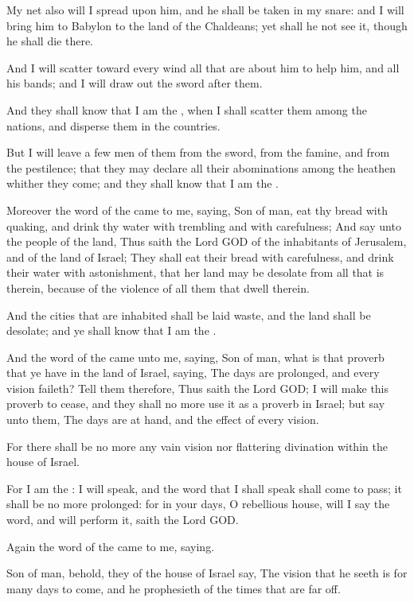 \Verse My net also will I spread upon him, and he shall be taken in my snare: and I will bring him to Babylon to the land of the Chaldeans; yet shall he not see it, though he shall die there.

\Verse And I will scatter toward every wind all that are about him to help him, and all his bands; and I will draw out the sword after them.

\Verse And they shall know that I am the \LORD, when I shall scatter them among the nations, and disperse them in the countries.

\Verse But I will leave a few men of them from the sword, from the famine, and from the pestilence; that they may declare all their abominations among the heathen whither they come; and they shall know that I am the \LORD.

\Verse Moreover the word of the \LORD came to me, saying, \Verse Son of man, eat thy bread with quaking, and drink thy water with trembling and with carefulness; \Verse And say unto the people of the land, Thus saith the Lord GOD of the inhabitants of Jerusalem, and of the land of Israel; They shall eat their bread with carefulness, and drink their water with astonishment, that her land may be desolate from all that is therein, because of the violence of all them that dwell therein.

\Verse And the cities that are inhabited shall be laid waste, and the land shall be desolate; and ye shall know that I am the \LORD.

\Verse And the word of the \LORD came unto me, saying, \Verse Son of man, what is that proverb that ye have in the land of Israel, saying, The days are prolonged, and every vision faileth?  \Verse Tell them therefore, Thus saith the Lord GOD; I will make this proverb to cease, and they shall no more use it as a proverb in Israel; but say unto them, The days are at hand, and the effect of every vision.

\Verse For there shall be no more any vain vision nor flattering divination within the house of Israel.

\Verse For I am the \LORD: I will speak, and the word that I shall speak shall come to pass; it shall be no more prolonged: for in your days, O rebellious house, will I say the word, and will perform it, saith the Lord GOD.

\Verse Again the word of the \LORD came to me, saying.

\Verse Son of man, behold, they of the house of Israel say, The vision that he seeth is for many days to come, and he prophesieth of the times that are far off.

